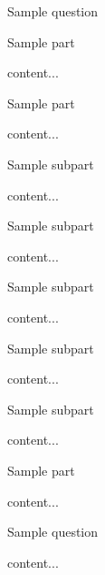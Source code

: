 \documentclass[11pt]{article} %
\begin{document}
\begin{qstn}[5]
	Sample question
\begin{assgnenum}
	\qitem Sample part
	\begin{soln}
		content...
	\end{soln}
	\qitem Sample part
	\begin{soln}
		content...
	\end{soln}
	\begin{assgnenum}
		\qitem Sample subpart
		\begin{soln}
			content...
		\end{soln}
		\qitem Sample subpart
		\begin{soln}
			content...
		\end{soln}
		\begin{assgnenum}
			\qitem Sample subpart
			\begin{soln}
				content...
			\end{soln}
			\qitem Sample subpart
			\begin{soln}
				content...
			\end{soln}
		\end{assgnenum}
		\qitem Sample subpart
		\begin{soln}
			content...
		\end{soln}
	\end{assgnenum}
	\qitem Sample part
	\begin{soln}
		content...
	\end{soln}
\end{assgnenum}
\end{qstn}

\begin{qstn}[6]
	Sample question
\begin{soln}
	content...
\end{soln}
\end{qstn}
\end{document}
